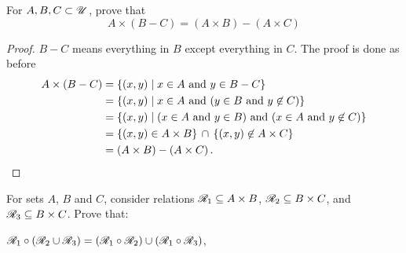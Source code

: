 \documentclass[a4paper, english, 12pt]{article} %
\begin{document}
\newpageanswer

\begin{problem}[11]
  For $A, B, C \subset \mathscr{U}$, prove that
  \begin{equation*}
    A \times (B - C) = (A \times B) - (A \times C)
  \end{equation*}
\end{problem}

\begin{answer}
  \begin{proof}
  $B - C$ means everything in $B$ except everything in $C$.
  The proof is done as before
    \begin{align*}
      A \times (B-C) 
      & = \{ (x,y) \mid x \in A \ \text{and} \ y \in B - C \} \\
      & = \{ (x,y) \mid x \in A \ \text{and} \ (y \in B \ \text{and} \ y \not\in C) \} \\
      & = \{ (x,y) \mid (x \in A \ \text{and} \ y \in B) \ \text{and} \ (x \in A \ \text{and} \ y \not\in C) \} \\
      & = \{ (x,y) \in A \times B \}
          \, \cap \, 
          \{ (x,y) \not\in A \times C \} \\
      & = (A \times B) - (A \times C)\,. \qedhere
    \end{align*}
  \end{proof}
\end{answer}



\begin{problem}[6]
  For sets $A$, $B$ and $C$, consider relations $\mathscr{R}_1 \subseteq A \times B$,
  $\mathscr{R}_2 \subseteq B \times C$, and $\mathscr{R}_3 \subseteq B \times C$. Prove that:
\end{problem}

\begin{subproblem}
  $\mathscr{R}_1 \circ (\mathscr{R}_2 \cup \mathscr{R}_3) = (\mathscr{R}_1 \circ \mathscr{R}_2) \cup (\mathscr{R}_1
  \circ \mathscr{R}_3)$,
\end{subproblem}
\end{document}
